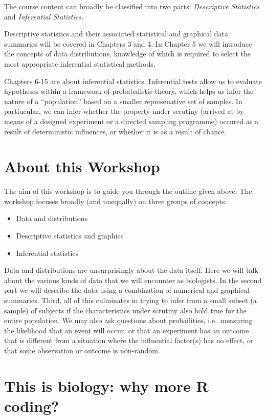 \documentclass[english,10pt,a4paper,oneside]{book}
\providecommand{\tightlist}{%
  \setlength{\itemsep}{0pt}\setlength{\parskip}{0pt}}
\theoremstyle{definition}
\theoremstyle{definition}
\theoremstyle{definition}
\theoremstyle{remark}
\begin{document}
The course content can broadly be classified into two parts:
\emph{Descriptive Statistics} and \emph{Inferential Statistics}.

Descriptive statistics and their associated statistical and graphical
data summaries will be covered in Chapters 3 and 4. In Chapter 5 we will
introduce the concepts of data distributions, knowledge of which is
required to select the most appropriate inferential statistical methods.

Chapters 6-15 are about inferential statistics. Inferential tests allow
us to evaluate hypotheses within a framework of probabalistic theory,
which helps us infer the nature of a \enquote{population} based on a
smaller represenative set of samples. In partiucular, we can infer
whether the property under scrutiny (arrived at by means of a designed
experiment or a directed sampling programme) occured as a result of
deterministic influences, or whether it is as a result of chance.

\section{About this Workshop}\label{about-this-workshop}

The aim of this workshop is to guide you through the outline given
above. The workshop focuses broadly (and unequally) on three groups of
concepts:

\begin{itemize}
\tightlist
\item
  Data and distributions
\item
  Descriptive statistics and graphics
\item
  Inferential statistics
\end{itemize}

Data and distributions are unsurprisingly about the data itself. Here we
will talk about the various kinds of data that we will encounter as
biologists. In the second part we will describe the data using a
combination of numerical and graphical summaries. Third, all of this
culminates in trying to infer from a small subset (a sample) of subjects
if the characteristics under scrutiny also hold true for the entire
population. We may also ask questions about probailities, i.e.~measuring
the likelihood that an event will occur, or that an experiment has an
outcome that is different from a situation where the influential
factor(s) has no effect, or that some observation or outcome is
non-random.

\section{This is biology: why more R
coding?}\label{this-is-biology-why-more-r-coding}
\end{document}
